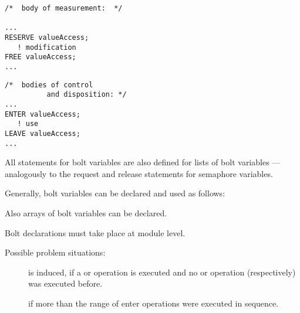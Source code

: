 \begin{multicols}{2}
\begin{lstlisting}
/*  body of measurement:  */

...
RESERVE valueAccess;
   ! modification
FREE valueAccess;
...
\end{lstlisting}
\columnbreak
\begin{lstlisting}
/*  bodies of control
          and disposition: */
...
ENTER valueAccess;
   ! use
LEAVE valueAccess;
...
\end{lstlisting}
\end{multicols}

All statements for bolt variables are also defined for lists of bolt
variables --- analogously to the request and release statements for
semaphore variables.

Generally, bolt variables can be declared and used as follows:

\begin{grammarframe}




\end{grammarframe}

Also arrays of bolt variables can be declared.

Bolt declarations must take place at module level.

Possible problem situations:

\begin{description}
\item[] is induced, if a  or  operation
   is executed and no  or  operation (respectively) 
   was executed before.
\item [] if more than the range of  enter
   operations were executed in sequence.
\end{description}



